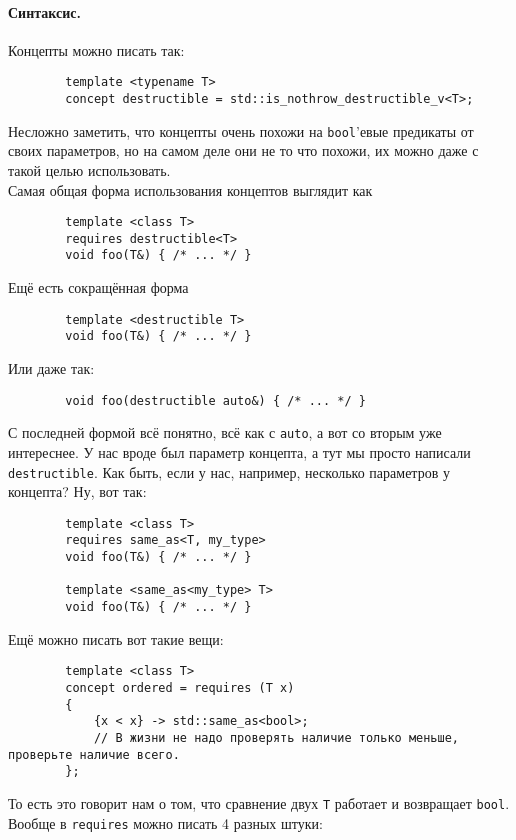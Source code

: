 \documentclass{article}
\begin{document}
    \paragraph{Синтаксис.}
    Концепты можно писать так:
    \begin{verbatim}
        template <typename T>
        concept destructible = std::is_nothrow_destructible_v<T>;
    \end{verbatim}
    Несложно заметить, что концепты очень похожи на \texttt{bool}'евые предикаты от своих параметров, но на самом деле они не то что похожи, их можно даже с такой целью использовать.\\
    Самая общая форма использования концептов выглядит как
    \begin{verbatim}
        template <class T>
        requires destructible<T>
        void foo(T&) { /* ... */ }
    \end{verbatim}
    Ещё есть сокращённая форма
    \begin{verbatim}
        template <destructible T>
        void foo(T&) { /* ... */ }
    \end{verbatim}
    Или даже так:
    \begin{verbatim}
        void foo(destructible auto&) { /* ... */ }
    \end{verbatim}
    С последней формой всё понятно, всё как с \texttt{auto}, а вот со вторым уже интереснее. У нас вроде был параметр концепта, а тут мы просто написали \texttt{destructible}. Как быть, если у нас, например, несколько параметров у концепта? Ну, вот так:
    \begin{verbatim}
        template <class T>
        requires same_as<T, my_type>
        void foo(T&) { /* ... */ }

        template <same_as<my_type> T>
        void foo(T&) { /* ... */ }
    \end{verbatim}
    Ещё можно писать вот такие вещи:
    \begin{verbatim}
        template <class T>
        concept ordered = requires (T x)
        {
            {x < x} -> std::same_as<bool>;
            // В жизни не надо проверять наличие только меньше, проверьте наличие всего.
        };
    \end{verbatim}
    То есть это говорит нам о том, что сравнение двух \texttt{T} работает и возвращает \texttt{bool}.\\
    Вообще в \texttt{requires} можно писать 4 разных штуки:
\end{document}
